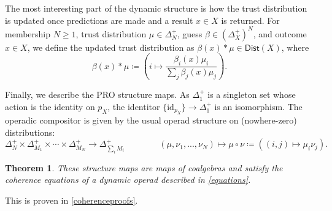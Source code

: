 \documentclass[11pt, one side, article]{memoir}
\theoremstyle{definition}
\theoremstyle{plain}
\newtheorem{theorem}[definitionx]{Theorem}
\newcommand{\Set}[1]{\mathsf{#1}}%
\newcommand{\id}{\mathrm{id}}
\newcommand{\tn}[1]{\textnormal{#1}}
\newcommand{\0}{\textsf{0}}
\newcommand{\1}{\tn{\textsf{1}}}
\newcommand{\tri}{\mathbin{\triangleleft}}
\newcommand{\dist}{\Set{Dist}}
\newcommand{\bet}{\Delta^+}
\begin{document}
The most interesting part of the dynamic structure is how the trust distribution is updated once predictions are made and a result $x\in X$ is returned. For membership $N\geq 1$, trust distribution $\mu\in\Delta^+_N$, guess $\beta\in(\bet_X)^N$, and outcome $x\in X$, we define the updated trust distribution as $\beta(x) * \mu \in\dist(X)$, where
\[
\beta(x) * \mu \coloneqq \left( i \mapsto \frac{\beta_i(x)\mu_i}{\sum_j \beta_j(x)\mu_j}\right).
\]

Finally, we describe the PRO structure maps. As $\Delta^+_1$ is a singleton set whose action is the identity on $p_X$, the identitor $\{\id_{p_X}\} \to \Delta^+_1$ is an isomorphism. The operadic compositor is given by the usual operad structure on (nowhere-zero) distributions:
\[
\Delta^+_N \times \Delta^+_{M_1} \times \cdots \times \Delta^+_{M_N} \to \Delta^+_{\sum_i M_i} \qquad\qquad (\mu,\nu_1,...,\nu_N) \mapsto \mu \circ \nu \coloneqq \left( (i,j) \mapsto \mu_i\nu_j \right).
\]

\begin{theorem}\label{predictionadaptive}%
These structure maps are maps of coalgebras and satisfy the coherence equations of a dynamic operad described in \cref{equations}.%
\end{theorem}

This is proven in \cref{coherenceproofs}.%

%
%
\end{document}
